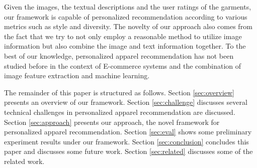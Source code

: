 Given the images, the textual descriptions and the user ratings of the garments,
  our framework is capable of personalized recommendation according to various metrics
  such as style and diversity.
The novelty of our approach also comes from the fact that
  we try to not only employ a reasonable method to utilize 
  image information but also combine the image and text information together.
To the best of our knowledge, personalized apparel recommendation has not been 
  studied before in the context of E-commerce systems and the combination of 
  image feature extraction and machine learning.

The remainder of this paper is structured as follows. 
Section \ref{sec:overview} presents an overview of our framework.
Section \ref{sec:challenge} discusses several technical challenges in personalized apparel recommendation are discussed.
Section \ref{sec:approach} presents our approach, the novel framework for personalized apparel recommendation.
Section \ref{sec:eval} shows some preliminary experiment results under our framework.
Section \ref{sec:conclusion} concludes this paper and discusses some future work.
Section \ref{sec:related} discusses some of the related work.


